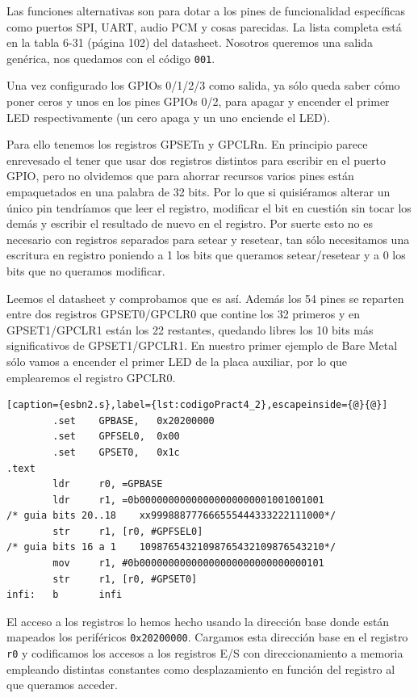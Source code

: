 Las funciones alternativas son para dotar a los pines de funcionalidad específicas
como puertos SPI, UART, audio PCM y cosas parecidas. La lista completa
está en la tabla 6-31 (página 102) del datasheet. Nosotros queremos una salida
genérica, nos quedamos con el código {\tt 001}.

Una vez configurado los GPIOs 0/1/2/3 como salida, ya sólo queda saber cómo poner ceros y unos
en los pines GPIOs 0/2, para apagar y encender el primer LED respectivamente (un cero apaga
y un uno enciende el LED).

Para ello tenemos los registros GPSETn y GPCLRn. En principio parece enrevesado el tener
que usar dos registros distintos para escribir en el puerto GPIO, pero no olvidemos que
para ahorrar recursos varios pines están empaquetados en una palabra de 32 bits. Por lo
que si quisiéramos alterar un único pin tendríamos que leer el registro, modificar el bit
en cuestión sin tocar los demás y escribir el resultado de nuevo en el registro. Por suerte
esto no es necesario con registros separados para setear y resetear, tan sólo necesitamos
una escritura en registro poniendo a 1 los bits que queramos setear/resetear y a 0 los bits
que no queramos modificar.

Leemos el datasheet y comprobamos que es así. Además los 54 pines se reparten entre dos
registros GPSET0/GPCLR0 que contine los 32 primeros y en GPSET1/GPCLR1 están los 22
restantes, quedando libres los 10 bits más significativos de GPSET1/GPCLR1. En nuestro
primer ejemplo de Bare Metal sólo vamos a encender el primer LED de la placa auxiliar,
por lo que emplearemos el registro GPCLR0.

\begin{lstlisting}[caption={esbn2.s},label={lst:codigoPract4_2},escapeinside={@}{@}]
        .set    GPBASE,   0x20200000
        .set    GPFSEL0,  0x00
        .set    GPSET0,   0x1c
.text
        ldr     r0, =GPBASE
        ldr     r1, =0b00000000000000000000001001001001
/* guia bits 20..18    xx999888777666555444333222111000*/
        str     r1, [r0, #GPFSEL0]
/* guia bits 16 a 1    10987654321098765432109876543210*/
        mov     r1, #0b00000000000000000000000000000101
        str     r1, [r0, #GPSET0]
infi:   b       infi
\end{lstlisting}

El acceso a los registros lo hemos hecho usando la dirección base donde
están mapeados los periféricos {\tt 0x20200000}. Cargamos esta dirección
base en el registro {\tt r0} y codificamos los accesos a los registros
E/S con direccionamiento a memoria empleando distintas constantes como
desplazamiento en función del registro al que queramos acceder.

